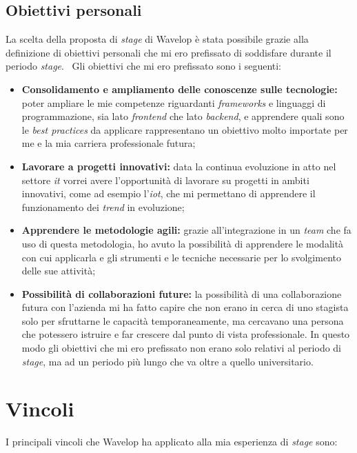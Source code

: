 \subsection{Obiettivi personali}
La scelta della proposta di \emph{stage} di Wavelop è stata possibile grazie alla definizione di obiettivi personali che mi ero prefissato di soddisfare durante il periodo \emph{stage}. \
Gli obiettivi che mi ero prefissato sono i seguenti:
\begin{itemize}
  \item \textbf{Consolidamento e ampliamento delle conoscenze sulle tecnologie:} poter ampliare le mie competenze riguardanti \emph{frameworks} e linguaggi di programmazione, sia lato \emph{\gls{frontend}} che lato \emph{\gls{backend}}, e apprendere quali sono le \emph{best practices} da applicare rappresentano un obiettivo molto importate per me e la mia carriera professionale futura;
  \item \textbf{Lavorare a progetti innovativi:} data la continua evoluzione in atto nel settore \emph{\acrshort{it}} vorrei avere l'opportunità di lavorare su progetti in ambiti innovativi, come ad esempio l'\emph{\acrlong{iot}}, che mi permettano di apprendere il funzionamento dei \emph{trend} in evoluzione;
  \item \textbf{Apprendere le metodologie agili:} grazie all'integrazione in un \emph{team} che fa uso di questa metodologia, ho avuto la possibilità di apprendere le modalità con cui applicarla e gli strumenti e le tecniche necessarie per lo svolgimento delle sue attività;
  \item \textbf{Possibilità di collaborazioni future:} la possibilità di una collaborazione futura con l'azienda mi ha fatto capire che non erano in cerca di uno stagista solo per sfruttarne le capacità temporaneamente, ma cercavano una persona che potessero istruire e far crescere dal punto di vista professionale. In questo modo gli obiettivi che mi ero prefissato non erano solo relativi al periodo di \emph{stage}, ma ad un periodo più lungo che va oltre a quello universitario.
\end{itemize}

\section{Vincoli}

I principali vincoli che Wavelop ha applicato alla mia esperienza di \emph{stage} sono:
